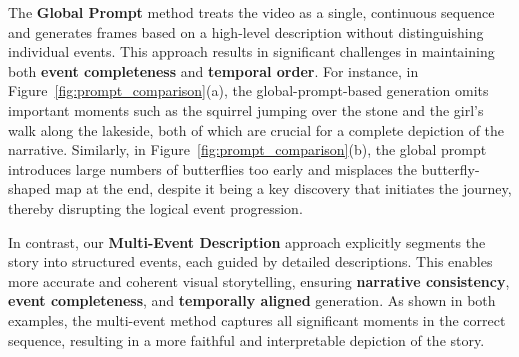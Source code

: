 The \textbf{Global Prompt} method treats the video as a single, continuous sequence and generates frames based on a high-level description without distinguishing individual events. This approach results in significant challenges in maintaining both \textbf{event completeness} and \textbf{temporal order}. For instance, in Figure~\ref{fig:prompt_comparison}(a), the global-prompt-based generation omits important moments such as the squirrel jumping over the stone and the girl’s walk along the lakeside, both of which are crucial for a complete depiction of the narrative. Similarly, in Figure~\ref{fig:prompt_comparison}(b), the global prompt introduces large numbers of butterflies too early and misplaces the butterfly-shaped map at the end, despite it being a key discovery that initiates the journey, thereby disrupting the logical event progression.

In contrast, our \textbf{Multi-Event Description} approach explicitly segments the story into structured events, each guided by detailed descriptions. This enables more accurate and coherent visual storytelling, ensuring \textbf{narrative consistency}, \textbf{event completeness}, and \textbf{temporally aligned} generation. As shown in both examples, the multi-event method captures all significant moments in the correct sequence, resulting in a more faithful and interpretable depiction of the story.


